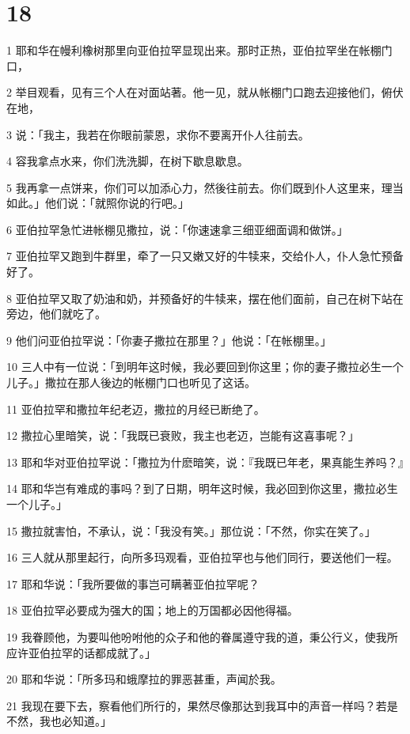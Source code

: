 \chapter{18}

\par 1 耶和华在幔利橡树那里向亚伯拉罕显现出来。那时正热，亚伯拉罕坐在帐棚门口，
\par 2 举目观看，见有三个人在对面站著。他一见，就从帐棚门口跑去迎接他们，俯伏在地，
\par 3 说：「我主，我若在你眼前蒙恩，求你不要离开仆人往前去。
\par 4 容我拿点水来，你们洗洗脚，在树下歇息歇息。
\par 5 我再拿一点饼来，你们可以加添心力，然後往前去。你们既到仆人这里来，理当如此。」他们说：「就照你说的行吧。」
\par 6 亚伯拉罕急忙进帐棚见撒拉，说：「你速速拿三细亚细面调和做饼。」
\par 7 亚伯拉罕又跑到牛群里，牵了一只又嫩又好的牛犊来，交给仆人，仆人急忙预备好了。
\par 8 亚伯拉罕又取了奶油和奶，并预备好的牛犊来，摆在他们面前，自己在树下站在旁边，他们就吃了。
\par 9 他们问亚伯拉罕说：「你妻子撒拉在那里？」他说：「在帐棚里。」
\par 10 三人中有一位说：「到明年这时候，我必要回到你这里；你的妻子撒拉必生一个儿子。」撒拉在那人後边的帐棚门口也听见了这话。
\par 11 亚伯拉罕和撒拉年纪老迈，撒拉的月经已断绝了。
\par 12 撒拉心里暗笑，说：「我既已衰败，我主也老迈，岂能有这喜事呢？」
\par 13 耶和华对亚伯拉罕说：「撒拉为什麽暗笑，说：『我既已年老，果真能生养吗？』
\par 14 耶和华岂有难成的事吗？到了日期，明年这时候，我必回到你这里，撒拉必生一个儿子。」
\par 15 撒拉就害怕，不承认，说：「我没有笑。」那位说：「不然，你实在笑了。」
\par 16 三人就从那里起行，向所多玛观看，亚伯拉罕也与他们同行，要送他们一程。
\par 17 耶和华说：「我所要做的事岂可瞒著亚伯拉罕呢？
\par 18 亚伯拉罕必要成为强大的国；地上的万国都必因他得福。
\par 19 我眷顾他，为要叫他吩咐他的众子和他的眷属遵守我的道，秉公行义，使我所应许亚伯拉罕的话都成就了。」
\par 20 耶和华说：「所多玛和蛾摩拉的罪恶甚重，声闻於我。
\par 21 我现在要下去，察看他们所行的，果然尽像那达到我耳中的声音一样吗？若是不然，我也必知道。」
